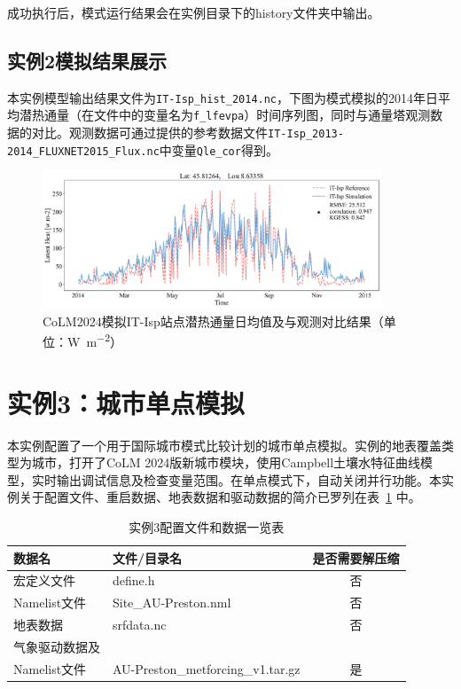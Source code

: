 成功执行后，模式运行结果会在实例目录下的history文件夹中输出。

\subsection{实例2模拟结果展示}

本实例模型输出结果文件为\texttt{IT-Isp\_hist\_2014.nc}，下图为模式模拟的2014年日平均潜热通量（在文件中的变量名为\texttt{f\_lfevpa}）时间序列图，同时与通量塔观测数据的对比。观测数据可通过提供的参考数据文件\texttt{IT-Isp\_2013-2014\_FLUXNET2015\_Flux.nc}中变量\texttt{Qle\_cor}得到。

\begin{figure}[htpb]
    \centering
    \includegraphics[width=0.90\textwidth]{figures/Example02_Site_IT-Isp.jpg}
    \caption{CoLM2024模拟IT-Isp站点潜热通量日均值及与观测对比结果（单位：\unit{W.m^{-2}}）}
    \label{fig:fig_example02_IT}
\end{figure}

\section{实例3：城市单点模拟}

本实例配置了一个用于国际城市模式比较计划的城市单点模拟。实例的地表覆盖类型为城市，打开了CoLM 2024版新城市模块，使用Campbell土壤水特征曲线模型，实时输出调试信息及检查变量范围。在单点模式下，自动关闭并行功能。本实例关于配置文件、重启数据、地表数据和驱动数据的简介已罗列在表~\ref{ex3table} 中。


\begin{table}[htbp]
\caption{实例3配置文件和数据一览表}
\centering \renewcommand{\arraystretch}{1.5}
\label{ex3table}
\begin{tabular}{llc}
\toprule
\textbf{数据名} & \textbf{文件/目录名} & \textbf{是否需要解压缩} \\

\midrule

宏定义文件 & define.h & 否 \\
Namelist文件 & Site\_AU-Preston.nml & 否 \\
地表数据 & srfdata.nc & 否 \\
气象驱动数据及\\Namelist文件 & AU-Preston\_metforcing\_v1.tar.gz & 是 \\

\bottomrule
\end{tabular}
\end{table}

